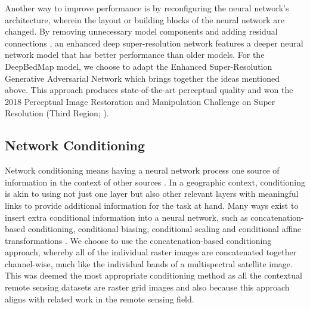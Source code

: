\documentclass[tc, noline]{copernicus}
\begin{document}
Another way to improve performance is by reconfiguring the neural network's architecture, wherein the layout or building blocks of the neural network are changed.
By removing unnecessary model components and adding residual connections \citep{HeDeepResidualLearning2015}, an enhanced deep super-resolution network \citep[EDSR;][]{LimEnhancedDeepResidual2017} features a deeper neural network model that has better performance than older models.
For the DeepBedMap model, we choose to adapt the Enhanced Super-Resolution Generative Adversarial Network \citep[ESRGAN;][]{WangESRGANEnhancedSuperResolution2019} which brings together the ideas mentioned above.
This approach produces state-of-the-art perceptual quality and won the 2018 Perceptual Image Restoration and Manipulation Challenge on Super Resolution (Third Region; \citealp{Blau2018PIRMChallenge2018}).

\subsection{Network Conditioning} \label{section:networkconditioning}

Network conditioning means having a neural network process one source of information in the context of other sources \citep{DumoulinFeaturewisetransformations2018}.
In a geographic context, conditioning is akin to using not just one layer but also other relevant layers with meaningful links to provide additional information for the task at hand.
Many ways exist to insert extra conditional information into a neural network, such as concatenation-based conditioning, conditional biasing, conditional scaling and conditional affine transformations \citep{DumoulinFeaturewisetransformations2018}.
We choose to use the concatenation-based conditioning approach, whereby all of the individual raster images are concatenated together channel-wise, much like the individual bands of a multispectral satellite image.
This was deemed the most appropriate conditioning method as all the contextual remote sensing datasets are raster grid images and also because this approach aligns with related work in the remote sensing field.
\end{document}
